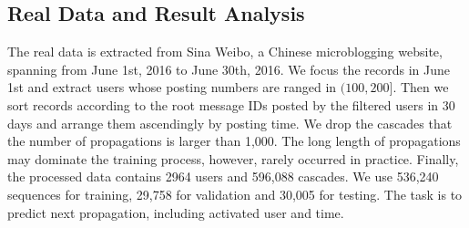 


\subsection{Real Data and Result Analysis}

The real data is extracted from Sina Weibo, a Chinese microblogging website,
spanning from June 1st, 2016 to June 30th, 2016. We focus the records in June
1st and extract users whose posting numbers are ranged in $(100,
200]$. Then we sort records according to the root
message IDs posted by the filtered users in 30 days and arrange them ascendingly
by posting time. We drop the cascades that the number of propagations is larger
than 1,000. The long length of propagations may dominate the training process,
however, rarely occurred in practice. 
Finally, the processed data contains 2964 users and 596,088 cascades. 
We use 536,240 sequences for training, 29,758 for validation and 30,005 for
testing. The task is to predict next propagation, including activated user and
time. 

